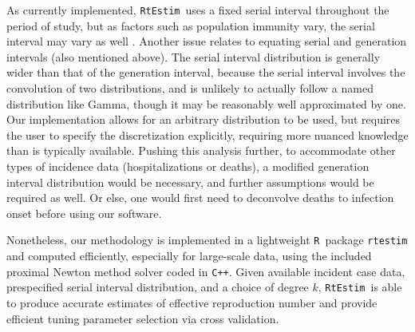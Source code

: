 \documentclass[10pt,letterpaper]{article}
\newcommand{\R}{\texttt{R}}
\newcommand{\cpp}{\texttt{C++}}
\def\RtEstim{\texttt{RtEstim}}
\newcommand{\citep}[1]{\cite{#1}}
\begin{document}
As currently implemented, \RtEstim\ uses a fixed serial interval throughout the
period of study, but as factors such as population immunity vary, the serial
interval may vary as well \citep{nash2023estimating}.  
Another issue relates to equating serial and generation intervals (also
mentioned above). The serial interval distribution is generally wider than that
of the generation interval, because the serial interval involves the convolution
of two distributions, and is unlikely to actually follow a named distribution
like Gamma, though it may be reasonably well approximated by one. Our
implementation allows for an arbitrary distribution to be used, but requires the
user to specify the discretization explicitly, requiring more nuanced knowledge
than is typically available. Pushing this analysis further, to accommodate other
types of incidence data (hospitalizations or deaths), a modified generation
interval distribution would be necessary, and further assumptions would be
required as well. Or else, one would first need to deconvolve deaths to
infection onset before using our software.


Nonetheless, our methodology is implemented in a lightweight \R\ package 
\texttt{rtestim} and computed efficiently, especially for large-scale data, 
using the included proximal Newton method solver coded in \cpp. 
Given available incident case data, prespecified serial interval
distribution, and a choice of degree $k$, \RtEstim\ is able to produce
accurate estimates of effective reproduction number and provide efficient
tuning parameter selection via cross validation. 
\end{document}
